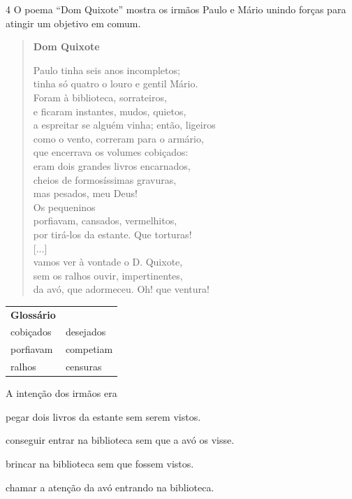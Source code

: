 \num{4} O poema ``Dom Quixote'' mostra os irmãos Paulo e Mário unindo
forças para atingir um objetivo em comum.

\begin{verse}
\textbf{Dom Quixote}

Paulo tinha seis anos incompletos;\\
tinha só quatro o louro e gentil Mário.\\
Foram à biblioteca, sorrateiros,\\
e ficaram instantes, mudos, quietos,\\
a espreitar se alguém vinha; então, ligeiros\\
como o vento, correram para o armário,\\
que encerrava os volumes cobiçados:\\
eram dois grandes livros encarnados,\\
cheios de formosíssimas gravuras,\\
mas pesados, meu Deus!\\
Os pequeninos\\
porfiavam, cansados, vermelhitos,\\
por tirá-los da estante. Que torturas!\\
{[}...{]}\\
vamos ver à vontade o D. Quixote,\\
sem os ralhos ouvir, impertinentes,\\
da avó, que adormeceu. Oh! que ventura!
\end{verse}


\begin{tabular}{ll}
\textbf{Glossário} & \mbox{}\\
cobiçados & desejados\\
porfiavam & competiam\\
ralhos & censuras\\
\end{tabular}

A intenção dos irmãos era

\begin{escolha}
\item pegar dois livros da estante sem serem vistos.

\item conseguir entrar na biblioteca sem que a avó os visse.

\item brincar na biblioteca sem que fossem vistos.

\item chamar a atenção da avó entrando na biblioteca.
\end{escolha}

